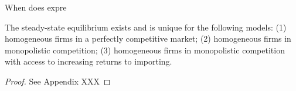 When does expre

\begin{proposition}\label{prop:test}
    The steady-state equilibrium exists and is unique for the following models: (1) homogeneous firms in a perfectly competitive market; (2) homogeneous firms in monopolistic competition; (3) homogeneous firms in monopolistic competition with access to increasing returns to importing. 
\end{proposition} 
\begin{proof}
    See Appendix XXX
\end{proof}
